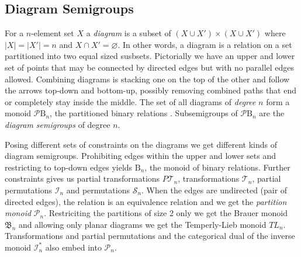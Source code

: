 \documentclass{amsart}
\newcommand{\BinRel}{\text{B}}
\newcommand{\InvMon}{\mathcal I}
\newcommand{\DualInvMon}{{\mathcal I}^*}
\newcommand{\FullTrans}{\mathcal T}
\newcommand{\Symmetric}{\mathcal S}
\newcommand{\Brauer}{\mathfrak B}
\newcommand{\Partition}{\mathcal P}
\newcommand{\todo}[1]{ \textsf{\color{red}{[TODO:  #1 ]}}}
\begin{document}
\subsection{Diagram Semigroups}

For a $n$-element set $X$ a \emph{diagram} is a subset of $(X\cup X')\times (X\cup X')$ where $|X|=|X'|=n$ and $X\cap X'=\varnothing$.
In other words, a diagram is a relation on a set partitioned into two equal sized susbsets.
Pictorially we have an upper and lower set of points that may be connected by directed edges but with no parallel edges allowed.
Combining diagrams is stacking one on the top of the other and follow the arrows top-down and bottom-up, possibly removing combined paths that end or completely stay inside the middle. \todo{This isn't very precise, is it?}
The set of all diagrams of \emph{degree} $n$ form a monoid $\Partition\BinRel_n$, the partitioned binary relations \cite{PartBinRel2013}. Subsemigroups of $\Partition\BinRel_n$ are the \emph{diagram semigroups} of degree $n$.

Posing different sets of constraints on the diagrams we get different kinds of diagram semigroups.
Prohibiting edges within the upper and lower sets and restricting to top-down edges yields $\BinRel_n$, the monoid of binary relations. Further constraints gives us partial transformations $P\FullTrans_n$, transformations $\FullTrans_n$, partial permutations $\InvMon_n$ and permutations $\Symmetric_n$.
When the edges are undirected (pair of directed edges), the relation is an equivalence relation and we get the \emph{partition monoid} $\Partition_n$.
Restriciting the partitions of size 2 only we get the Brauer monoid $\Brauer_n$ and allowing only planar diagrams we get the Temperly-Lieb monoid $TL_n$.
Transformations and partial permutations and the categorical dual of the inverse monoid $\DualInvMon_n$ also embed into $\Partition_n$.
\todo{Ask JE for quick explanation why $P\FullTrans_n$ does not embed into $\Partition_n$.}


\end{document}
